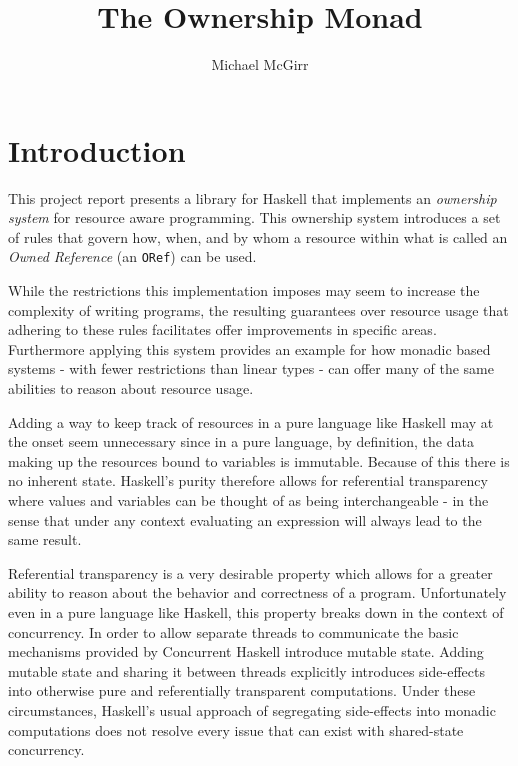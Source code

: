 \documentclass[onehalf,11pt]{beavtex}
\title{The Ownership Monad}
\author{Michael McGirr}
\begin{document}
\maketitle

\mainmatter

\chapter{Introduction}

This project report presents a library for Haskell that implements an
\textit{ownership system} for resource aware programming. This ownership system
introduces a set of rules that govern how, when, and by whom a resource within
what is called an \textit{Owned Reference} (an \texttt{ORef}) can be used.

While the restrictions this implementation imposes may seem to increase the
complexity of writing programs, the resulting guarantees over resource usage
that adhering to these rules facilitates offer improvements in specific areas.
Furthermore applying this system provides an example for how monadic based
systems - with fewer restrictions than linear types - can offer many of the same
abilities to reason about resource usage.

Adding a way to keep track of resources in a pure language like Haskell may
at the onset seem unnecessary since in a pure language, by definition, %
the data making up the resources bound to variables is immutable. Because of
this there is no inherent state.  Haskell's purity therefore allows for referential
transparency where values and variables can be thought of as being
interchangeable - in the sense that under any context evaluating an expression will
always lead to the same result. %

Referential transparency is a very desirable property which allows for a greater
ability to reason about the behavior and correctness of a program.
Unfortunately even in a pure language like Haskell, this property breaks down in
the context of concurrency.  In order to allow separate threads to communicate
the basic mechanisms provided by Concurrent Haskell introduce mutable state.
Adding mutable state and sharing it between threads explicitly introduces
side-effects into otherwise pure and referentially transparent computations.
Under these circumstances, Haskell's usual approach of segregating side-effects
into monadic computations does not resolve every issue that can exist with
shared-state concurrency.
\end{document}
